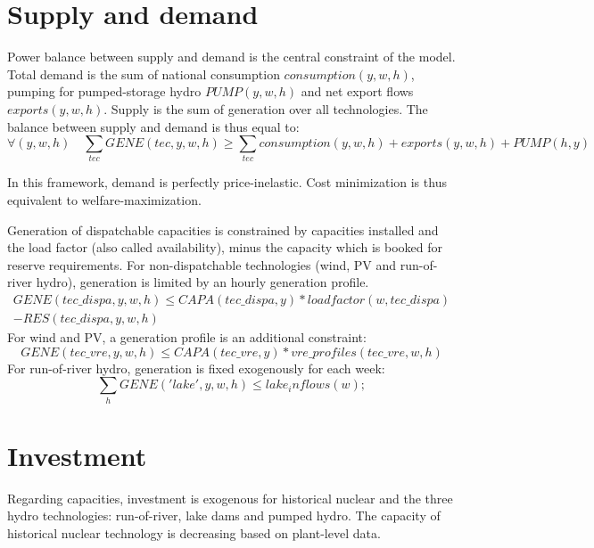 \documentclass[authoryear]{elsarticle}
\begin{document}
\section{Supply and demand}

Power balance between supply and demand is the central constraint of the model. 
Total demand is the sum of national consumption $consumption(y,w,h)$, pumping for pumped-storage hydro $PUMP(y,w,h)$ and net export flows $exports(y,w,h)$. 
Supply is the sum of generation over all technologies.
The balance between supply and demand is thus equal to:
\begin{equation}
  \forall(y,w,h) \quad \sum_{tec} GENE(tec,y,w,h) \geq \sum_{tec} consumption(y,w,h)   + exports(y,w,h) + PUMP(h,y)
\end{equation}

In this framework, demand is perfectly price-inelastic. Cost minimization is thus equivalent to welfare-maximization.

Generation of dispatchable capacities is constrained by capacities installed and the load factor (also called availability), minus the capacity which is booked for reserve requirements. 
For non-dispatchable technologies (wind, PV and run-of-river hydro), generation is limited by an hourly generation profile.
\begin{multline}
  GENE(tec\_dispa,y,w,h)      \leq  CAPA(tec\_dispa,y)*loadfactor(w,tec\_dispa) \\ - RES(tec\_dispa,y,w,h)
\end{multline}
For wind and PV, a generation profile is an additional constraint:
\begin{equation}
  GENE(tec\_vre,y,w,h)        \leq  CAPA(tec\_vre,y)*vre\_profiles(tec\_vre,w,h) 
\end{equation}
For run-of-river hydro, generation is fixed exogenously for each week:
\begin{equation}
  \sum_h GENE('lake',y,w,h) \leq lake_inflows(w) ;
\end{equation}

\section{Investment}

Regarding capacities, investment is exogenous for historical nuclear and the three hydro technologies: run-of-river, lake dams and pumped hydro.
The capacity of historical nuclear technology is decreasing based on plant-level data. 
\end{document}
